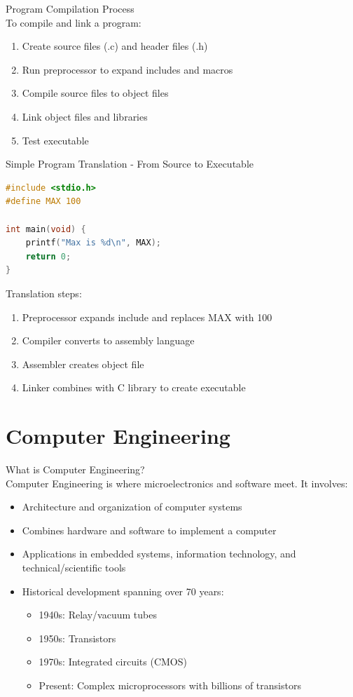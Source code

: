 \begin{KR}{Program Compilation Process}\\
To compile and link a program:
\begin{enumerate}
  \item Create source files (.c) and header files (.h)
  \item Run preprocessor to expand includes and macros
  \item Compile source files to object files
  \item Link object files and libraries
  \item Test executable
\end{enumerate}
\end{KR}

\begin{code}{Simple Program Translation - From Source to Executable}
\begin{lstlisting}[language=C, style=base]
#include <stdio.h>
#define MAX 100

int main(void) {
    printf("Max is %d\n", MAX);
    return 0;
}
\end{lstlisting}

Translation steps:
\begin{enumerate}
  \item Preprocessor expands include and replaces MAX with 100
  \item Compiler converts to assembly language
  \item Assembler creates object file
  \item Linker combines with C library to create executable
\end{enumerate}
\end{code}

\section{Computer Engineering}

\begin{concept}{What is Computer Engineering?}\\
Computer Engineering is where microelectronics and software meet. It involves:
\begin{itemize}
  \item Architecture and organization of computer systems
  \item Combines hardware and software to implement a computer
  \item Applications in embedded systems, information technology, and technical/scientific tools
  \item Historical development spanning over 70 years:
    \begin{itemize}
      \item 1940s: Relay/vacuum tubes
      \item 1950s: Transistors
      \item 1970s: Integrated circuits (CMOS)
      \item Present: Complex microprocessors with billions of transistors
    \end{itemize}
\end{itemize}
\end{concept}

